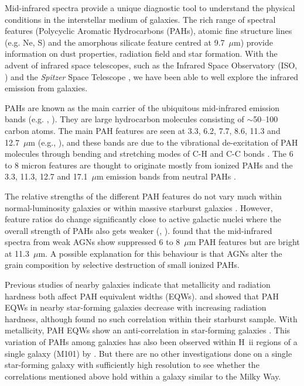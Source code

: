 Mid-infrared spectra provide a unique diagnostic tool to understand the physical conditions in the interstellar medium of galaxies. 
The rich range of spectral features (Polycyclic Aromatic Hydrocarbons (PAHs), atomic fine structure lines (e.g. Ne, S) and the
amorphous silicate feature centred at 9.7~$\mu$m) provide information on dust properties, radiation field and star formation. 
With the advent of infrared space telescopes, such as the Infrared Space Observatory (ISO, \citealt{Kessler1996}) and 
the {\em Spitzer} Space Telescope \citep{spitzer2004}, we have been able to well explore the infrared emission from galaxies. 

PAHs are known as the main carrier of the ubiquitous mid-infrared emission bands (e.g. \citealt{Allamandola1989}, 
\citealt{Tielens2008}). They are large hydrocarbon molecules consisting of $\sim$50--100 carbon atoms. 
The main PAH features are seen at 3.3, 6.2, 7.7, 8.6, 11.3 and 12.7~$\mu $m (e.g.\citealt{Mattila1996}, \citealt{Peeters2002}), 
and these bands are due to the vibrational de-excitation of PAH molecules  through bending and stretching modes of C-H and C-C bonds \citep{Tielens:2005lr}. 
The 6 to 8 micron features are thought to originate mostly from ionized PAHs and the 3.3, 11.3, 12.7 and 17.1~$\mu$m 
emission bands from neutral PAHs \citep{Peeters2002}. 


The relative strengths of the different PAH features do not vary much within normal-luminosity galaxies \citep{Smith:2007lr} or within 
massive starburst galaxies \citep{Brandl2006}. However, feature ratios do change significantly close to active galactic nuclei where the overall
strength of PAHs also gets weaker (\citealt{Roche1991}, \citealt{Smith:2007lr}). \citet{Smith:2007lr}  found that the mid-infrared 
spectra from weak AGNs show suppressed 6 to 8~$\mu$m PAH features but are bright at 11.3~$\mu$m. 
A possible explanation for this behaviour is that AGNs alter the grain composition by selective destruction of small ionized PAHs. 

 
Previous studies of nearby galaxies indicate that metallicity and radiation hardness both affect PAH equivalent widths (EQWs). 
\citet{Smith:2007lr} and \citet{Engelbracht_2008} showed that PAH EQWs in nearby star-forming galaxies  decrease with increasing radiation hardness,
although  \citet{Brandl2006} found no such correlation within their starburst sample.  With metallicity, PAH EQWs show an anti-correlation 
in star-forming galaxies \citep{Marble_2010}. This variation of PAHs among galaxies has also been observed within H~{\sc ii} regions 
of a single galaxy (M101) by \citet{Gordon:2008lr}. But there are no other investigations done on a single star-forming galaxy with 
sufficiently high resolution to see whether the correlations mentioned above hold within a galaxy similar to the Milky Way.

